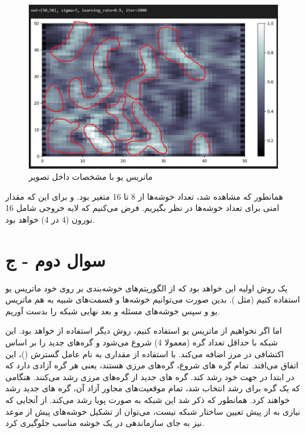 \documentclass{article}
\begin{document}
\begin{figure}[!h]
    \centering\includegraphics[scale=.65]{./p3-14}
    \caption{ماتریس یو با مشخصات داخل تصویر}\label{fig.314}
\end{figure}


\cleardoublepage

همانطور که مشاهده شد، تعداد خوشه‌ها از 8 تا 16 متغیر بود. و برای این‌ که مقدار امنی برای تعداد خوشه‌ها در نظر بگیریم. فرض می‌کنیم که لایه خروجی شامل 16 نورون (4 در 4) خواهد بود. 


\section{سوال دوم - ج}

یک روش اولیه این خواهد بود که از الگوریتم‌های خوشه‌بندی بر روی خود ماتریس یو استفاده کنیم (مثل ). بدین صورت می‌توانیم خوشه‌ها و قسمت‌های شبیه به هم ماتریس یو و سپس خوشه‌های مسئله و بعد نهایی شبکه را بدست آوریم.

اما اگر نخواهیم از ماتریس یو استفاده کنیم، روش دیگر استفاده از  خواهد بود. این شبکه با حداقل تعداد گره (معمولا 4) شروع می‌شود و گره‌های جدید را بر اساس اکتشافی در مرز اضافه می‌کند. با استفاده از مقداری به نام عامل گسترش ()، این اتفاق می‌افتد. تمام گره های شروع، گره‌های مرزی هستند، یعنی هر گره آزادی دارد که در ابتدا در جهت خود رشد کند. گره های جدید از گره‌های مرزی رشد می‌کنند. هنگامی که یک گره برای رشد انتخاب شد، تمام موقعیت‌های مجاور آزاد آن، گره های جدید رشد خواهند کرد. همانطور که ذکر شد این شبکه به صورت پویا رشد می‌کند. از آنجایی که نیازی به از پیش تعیین ساختار شبکه نیست، می‌توان از تشکیل خوشه‌های پیش از موعد نیز به جای سازماندهی در یک خوشه مناسب جلوگیری کرد.
\end{document}
